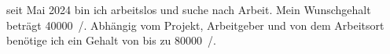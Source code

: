 		seit Mai 2024 bin ich arbeitslos und suche nach Arbeit.
		Mein Wunschgehalt beträgt \SI{40000}{\sieuro/\year}.
		Abhängig vom Projekt, Arbeitgeber und von dem Arbeitsort benötige ich ein Gehalt von bis zu \SI{80000}{\sieuro/\year}.